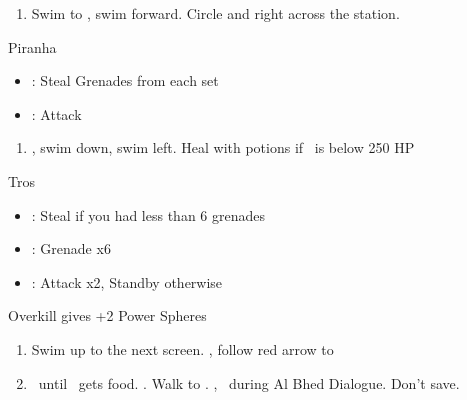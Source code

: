 \begin{enumerate}[resume]
	\item Swim to \save, swim forward. Circle and right across the station.
\end{enumerate}
\begin{battle}{Piranha}
	\begin{itemize}
		\item \rikku: Steal Grenades from each set
		\item \tidus: Attack
	\end{itemize}
\end{battle}
\begin{enumerate}[resume]
	\item \cs, swim down, swim left. Heal with potions if \rikku\ is  below 250 HP
\end{enumerate}
\begin{battle}[2200]{Tros}
	\begin{itemize}
		\item \rikku: Steal if you had less than 6 grenades
		\item \rikku: Grenade x6
		\item \tidus: Attack x2, Standby otherwise
	\end{itemize}
	Overkill gives +2 Power Spheres
\end{battle}
\begin{enumerate}[resume]
	\item Swim up to the next screen. \cs, follow red arrow to \cs[0:50]
	\item \sd\ until \tidus \ gets food. \cs[3:00]. Walk to \rikku. \cs[2:30], \sd\ during Al Bhed Dialogue. Don't save.
\end{enumerate}